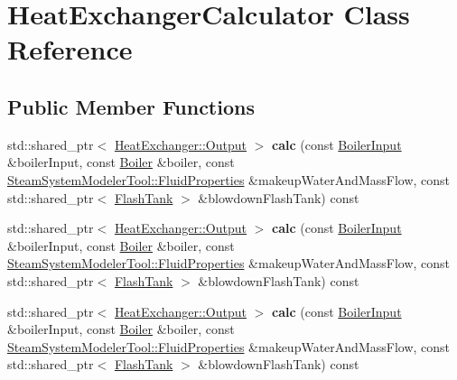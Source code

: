 \hypertarget{class_heat_exchanger_calculator}{}\section{Heat\+Exchanger\+Calculator Class Reference}
\label{class_heat_exchanger_calculator}
\subsection*{Public Member Functions}
\begin{DoxyCompactItemize}
\item 
\mbox{\label{class_heat_exchanger_calculator_a3565c2338e20f1ed84152baad80bb236}} 
std\+::shared\+\_\+ptr$<$ \hyperlink{struct_heat_exchanger_1_1_output}{Heat\+Exchanger\+::\+Output} $>$ {\bfseries calc} (const \hyperlink{class_boiler_input}{Boiler\+Input} \&boiler\+Input, const \hyperlink{class_boiler}{Boiler} \&boiler, const \hyperlink{struct_steam_system_modeler_tool_1_1_fluid_properties}{Steam\+System\+Modeler\+Tool\+::\+Fluid\+Properties} \&makeup\+Water\+And\+Mass\+Flow, const std\+::shared\+\_\+ptr$<$ \hyperlink{class_flash_tank}{Flash\+Tank} $>$ \&blowdown\+Flash\+Tank) const
\item 
\mbox{\label{class_heat_exchanger_calculator_ad4645eabb2b0c049d2a60b89348f5966}} 
std\+::shared\+\_\+ptr$<$ \hyperlink{struct_heat_exchanger_1_1_output}{Heat\+Exchanger\+::\+Output} $>$ {\bfseries calc} (const \hyperlink{class_boiler_input}{Boiler\+Input} \&boiler\+Input, const \hyperlink{class_boiler}{Boiler} \&boiler, const \hyperlink{struct_steam_system_modeler_tool_1_1_fluid_properties}{Steam\+System\+Modeler\+Tool\+::\+Fluid\+Properties} \&makeup\+Water\+And\+Mass\+Flow, const std\+::shared\+\_\+ptr$<$ \hyperlink{class_flash_tank}{Flash\+Tank} $>$ \&blowdown\+Flash\+Tank) const
\item 
\mbox{\label{class_heat_exchanger_calculator_ad4645eabb2b0c049d2a60b89348f5966}} 
std\+::shared\+\_\+ptr$<$ \hyperlink{struct_heat_exchanger_1_1_output}{Heat\+Exchanger\+::\+Output} $>$ {\bfseries calc} (const \hyperlink{class_boiler_input}{Boiler\+Input} \&boiler\+Input, const \hyperlink{class_boiler}{Boiler} \&boiler, const \hyperlink{struct_steam_system_modeler_tool_1_1_fluid_properties}{Steam\+System\+Modeler\+Tool\+::\+Fluid\+Properties} \&makeup\+Water\+And\+Mass\+Flow, const std\+::shared\+\_\+ptr$<$ \hyperlink{class_flash_tank}{Flash\+Tank} $>$ \&blowdown\+Flash\+Tank) const
\end{DoxyCompactItemize}



